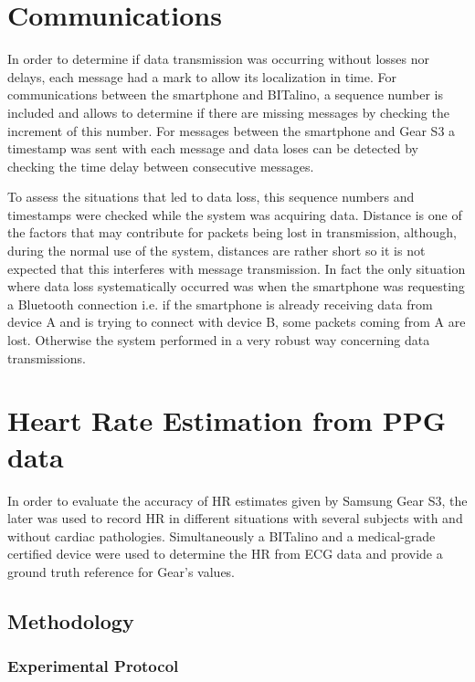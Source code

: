 \section{Communications}

In order to determine if data transmission was occurring without losses nor delays, each message had a mark to allow its localization in time. For communications between the smartphone and BITalino, a sequence number is included and allows to determine if there are missing messages by checking the increment of this number. For messages between  the smartphone and Gear S3 a timestamp was sent with each message and data loses can be detected by checking the time delay between consecutive messages.

To assess the situations that led to data loss, this sequence numbers and timestamps were checked while the system was acquiring data. Distance is one of the factors that may contribute for packets being lost in transmission, although, during the normal use of the system, distances are rather short so it is not expected that this interferes with message transmission. In fact the only situation where data loss systematically occurred was when the smartphone was requesting a Bluetooth connection i.e. if the smartphone is already receiving data from device A and is trying to connect with device B, some packets coming from A are lost. Otherwise the system performed in a very robust way concerning data transmissions.

\section{Heart Rate Estimation from PPG data}

In order to evaluate the accuracy of HR estimates given by Samsung Gear S3, the later was used to record HR in different situations with several subjects with and without cardiac pathologies. Simultaneously a BITalino  \cite{bitalinoguerreiro2013bitalino} and a medical-grade certified device were used to determine the HR from ECG data and provide a ground truth reference for Gear's values.

\subsection{Methodology}

\subsubsection{Experimental Protocol}
\label{chapter:experiments}

